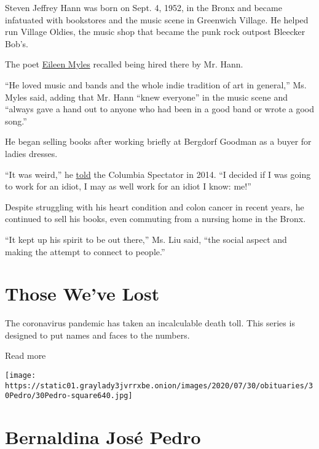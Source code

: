 Steven Jeffrey Hann was born on Sept. 4, 1952, in the Bronx and became
infatuated with bookstores and the music scene in Greenwich Village. He
helped run Village Oldies, the music shop that became the punk rock
outpost Bleecker Bob's.

The poet
\href{https://www.nytimes3xbfgragh.onion/2016/01/31/nyregion/how-eileen-myles-poet-spends-her-sundays.html}{Eileen
Myles} recalled being hired there by Mr. Hann.

``He loved music and bands and the whole indie tradition of art in
general,'' Ms. Myles said, adding that Mr. Hann ``knew everyone'' in the
music scene and ``always gave a hand out to anyone who had been in a
good band or wrote a good song.''

He began selling books after working briefly at Bergdorf Goodman as a
buyer for ladies dresses.

``It was weird,'' he
\href{https://www.columbiaspectator.com/2014/04/17/bookseller-outside-milano-talks-about-cu-attitude-useless-mohi-restaurants-and-reading/}{told}
the Columbia Spectator in 2014. ``I decided if I was going to work for
an idiot, I may as well work for an idiot I know: me!''

Despite struggling with his heart condition and colon cancer in recent
years, he continued to sell his books, even commuting from a nursing
home in the Bronx.

``It kept up his spirit to be out there,'' Ms. Liu said, ``the social
aspect and making the attempt to connect to people.''

\href{https://www.nytimes3xbfgragh.onion/interactive/2020/obituaries/people-died-coronavirus-obituaries.html?action=click\&pgtype=Article\&state=default\&region=BELOW_MAIN_CONTENT\&context=covid_obits_promo}{}

\hypertarget{those-weve-lost}{%
\section{Those We've Lost}\label{those-weve-lost}}

The coronavirus pandemic has taken an incalculable death toll. This
series is designed to put names and faces to the numbers.

Read more

\texttt{[image: https://static01.graylady3jvrrxbe.onion/images/2020/07/30/obituaries/30Pedro/30Pedro-square640.jpg]}

\hypertarget{bernaldina-josuxe9-pedro}{%
\section{Bernaldina José Pedro}\label{bernaldina-josuxe9-pedro}}

